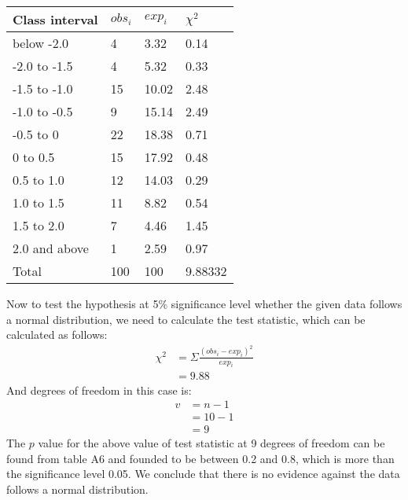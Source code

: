 \documentclass[12pt]{article}
\begin{document}
\begin{table}[h]
\begin{tabular}{|l|l|l|l|}
\hline
Class interval & $obs_i$ & $exp_i$ & $\chi^2$ \\ \hline
below -2.0     & 4      & 3.32   & 0.14                                   \\ \hline
-2.0 to -1.5   & 4      & 5.32   & 0.33                                   \\ \hline
-1.5 to -1.0   & 15     & 10.02  & 2.48                                   \\ \hline
-1.0 to -0.5   & 9      & 15.14  & 2.49                                   \\ \hline
-0.5 to 0      & 22     & 18.38  & 0.71                                   \\ \hline
0 to 0.5       & 15     & 17.92  & 0.48                                   \\ \hline
0.5 to 1.0     & 12     & 14.03  & 0.29                                   \\ \hline
1.0 to 1.5     & 11     & 8.82   & 0.54                                   \\ \hline
1.5 to 2.0     & 7      & 4.46   & 1.45                                   \\ \hline
2.0 and above  & 1      & 2.59   & 0.97                                   \\ \hline
Total          & 100    & 100    & 9.88332                                \\ \hline
\end{tabular}
\end{table}
Now to test the hypothesis at 5\% significance level whether the given data follows a normal distribution, we need to calculate the test statistic, which can be calculated as follows:
\begin{align*}
\chi^2 &= \Sigma\frac{(obs_i - exp_i)^2}{exp_i} \\
	   &= 9.88
\end{align*}
And degrees of freedom in this case is:
\begin{align*}
v &= n-1 \\
  &= 10-1 \\
  &= 9
\end{align*}
The $p$ value for the above value of test statistic at 9 degrees of freedom can be found from table A6 and founded to be between 0.2 and 0.8, which is more than the significance level 0.05. We conclude that there is no evidence against the data follows a normal distribution.
\end{document}
